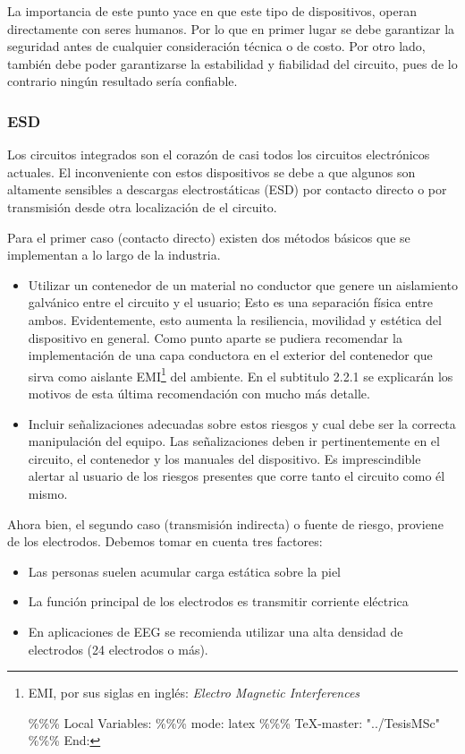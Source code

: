 La importancia de este punto yace en que este tipo de dispositivos, operan directamente con seres humanos. Por lo que en primer lugar se debe garantizar la seguridad antes de cualquier consideración técnica o de costo. Por otro lado, también debe poder garantizarse la estabilidad y fiabilidad del circuito, pues de lo contrario ningún resultado sería confiable.

\subsubsection{ESD}
\label{sec:orgd26f010}
Los circuitos integrados son el corazón de casi todos los circuitos electrónicos actuales. El inconveniente con estos dispositivos se debe a que algunos son altamente sensibles a descargas electrostáticas (ESD) por contacto directo o por transmisión desde otra localización de el circuito.

Para el primer caso (contacto directo) existen dos métodos básicos que se implementan a lo largo de la industria.

\begin{itemize}
\item Utilizar un contenedor de un material no conductor que genere un aislamiento galvánico entre el circuito y el usuario; Esto es una separación física entre ambos. Evidentemente, esto aumenta la resiliencia, movilidad y estética del dispositivo en general. Como punto aparte se pudiera recomendar la implementación de una capa conductora en el exterior del contenedor que sirva como aislante EMI\footnote{EMI, por sus siglas en inglés: \emph{Electro Magnetic Interferences}

\%\%\% Local Variables:
\%\%\% mode: latex
\%\%\% \TeX{}-master: "../TesisMSc"
\%\%\% End:} del ambiente. En el subtitulo 2.2.1 se explicarán los motivos de esta última recomendación con mucho más detalle.

\item Incluir señalizaciones adecuadas sobre estos riesgos y cual debe ser la correcta manipulación del equipo. Las señalizaciones deben ir pertinentemente en el circuito, el contenedor y los manuales del dispositivo. Es imprescindible alertar al usuario de los riesgos presentes que corre tanto el circuito como él mismo.
\end{itemize}

Ahora bien, el segundo caso (transmisión indirecta) o fuente de riesgo, proviene de los electrodos. Debemos tomar en cuenta tres factores:
\begin{itemize}
\item Las personas suelen acumular carga estática sobre la piel
\item La función principal de los electrodos es transmitir corriente eléctrica
\item En aplicaciones de EEG se recomienda utilizar una alta densidad de electrodos (24 electrodos o más).
\end{itemize}

